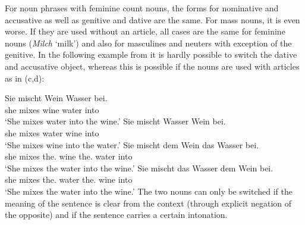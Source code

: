 For noun phrases with feminine count nouns, the forms for nominative and accusative as well as genitive and dative are the same.
For mass nouns, it is even worse. If they are used without an article, all cases are the same for feminine nouns (\eg \emph{Milch} `milk')
and also for masculines and neuters with exception of the genitive. In the following example from
\citet[]{Wegener85b} it is hardly possible to switch the dative and accusative object,
whereas this is possible if the nouns are used with articles as in (c,d): 

\eal
\ex 
\gll Sie mischt Wein Wasser bei.\\
     she mixes wine water into\\
\glt `She mixes water into the wine.'
\ex 
\gll Sie mischt Wasser Wein bei.\\
     she mixes water wine into\\
\glt `She mixes wine into the water.'
\ex 
\gll Sie mischt dem Wein das Wasser bei.\\
     she mixes the.\dat{} wine the.\acc{} water into\\
\glt `She mixes the water into the wine.'
\ex 
\gll Sie mischt das Wasser dem Wein bei.\\
	she mixes the.\acc{} water the.\dat{} wine into\\
\glt `She mixes the water into the wine.'
\zl
The two nouns can only be switched if the meaning of the sentence is clear from the context (\eg through explicit negation of the opposite)
and if the sentence carries a certain intonation.

